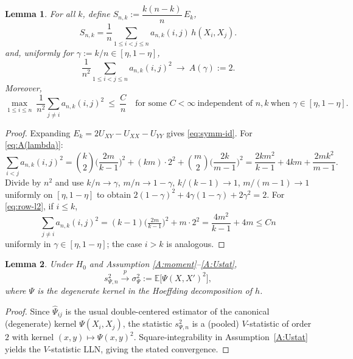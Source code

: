 \documentclass[11pt]{article}
\numberwithin{theorem}{section}
\newtheorem{Lemma}{Lemma}
\numberwithin{Lemma}{section}
\numberwithin{Definition}{section}
\begin{document}
\begin{Lemma}\label{lem:weights}
For all $k$, define $S_{n,k}:=\dfrac{k(n-k)}{n}\,E_k$,
\begin{equation}\label{eq:symm-id}
S_{n,k}=\frac{1}{n}\sum_{1\le i<j\le n} a_{n,k}(i,j)\,h(X_i,X_j).
\end{equation}
and, uniformly for $\gamma:=k/n\in[\eta,1-\eta]$,
\begin{equation}\label{eq:A(lambda)}
\frac{1}{n^2}\sum_{1\le i<j\le n} a_{n,k}(i,j)^2 \ \longrightarrow\ A(\gamma):=2.
\end{equation}
Moreover,
\begin{equation}\label{eq:row-l2}
\max_{1\le i\le n}\ \frac{1}{n^2}\sum_{j\ne i} a_{n,k}(i,j)^2 \ \le\ \frac{C}{n}
\quad\text{for some }C<\infty\ \text{independent of }n,k\ \text{when }\gamma\in[\eta,1-\eta].
\end{equation}
\end{Lemma}

\begin{proof}
Expanding $E_k=2U_{XY}-U_{XX}-U_{YY}$ gives \eqref{eq:symm-id}.
For \eqref{eq:A(lambda)}:
\[
\sum_{i<j} a_{n,k}(i,j)^2
=\binom{k}{2}\Big(\frac{2m}{k-1}\Big)^2 + (km)\cdot 2^2 + \binom{m}{2}\Big(\frac{2k}{m-1}\Big)^2
=\frac{2km^2}{k-1}+4km+\frac{2mk^2}{m-1}.
\]
Divide by $n^2$ and use $k/n\to\gamma$, $m/n\to 1-\gamma$, $k/(k-1)\to1$, $m/(m-1)\to1$ uniformly on $[\eta,1-\eta]$ to obtain $2(1-\gamma)^2+4\gamma(1-\gamma)+2\gamma^2=2$. For \eqref{eq:row-l2}, if $i\le k$,
\[
\sum_{j\ne i} a_{n,k}(i,j)^2
=(k-1)\Big(\tfrac{2m}{k-1}\Big)^2 + m\cdot 2^2
=\frac{4m^2}{k-1}+4m
\le C n
\]
uniformly in $\gamma\in[\eta,1-\eta]$; the case $i>k$ is analogous.
\end{proof}

\begin{Lemma}\label{lem21}
Under $H_0$ and Assumption \ref{A:moment}--\ref{A:Ustat},
\begin{equation}
s_{\Psi,n}^2 \xrightarrow{p} \sigma_\Psi^2 := \mathbb{E}\big[\Psi(X,X')^2\big],
\end{equation}
where $\Psi$ is the degenerate kernel in the Hoeffding decomposition of $h$.
\end{Lemma}
\begin{proof}
Since $\hat{\Psi}_{ij}$ is the usual double-centered estimator of the canonical (degenerate) kernel
$\Psi(X_i,X_j)$, the statistic $s_{\Psi,n}^2$ is a (pooled) $V$-statistic of order $2$ with kernel
$(x,y)\mapsto \Psi(x,y)^2$. Square-integrability in Assumption~\ref{A:Ustat} yields the $V$-statistic LLN, giving the stated
convergence.
\end{proof}
\end{document}
